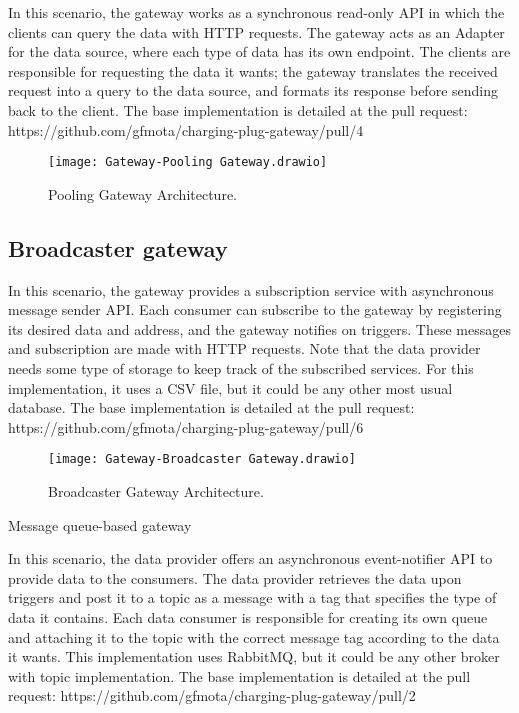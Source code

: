 In this scenario, the gateway works as a synchronous read-only API in which the clients can query the data with HTTP requests. The gateway acts as an Adapter for the data source, where each type of data has its own endpoint. The clients are responsible for requesting the data it wants; the gateway translates the received request into a query to the data source, and formats its response before sending back to the client. The base implementation is detailed at the pull request: https://github.com/gfmota/charging-plug-gateway/pull/4

\begin{figure}
    \centering
    \texttt{[image: Gateway-Pooling Gateway.drawio]}
    \caption{Pooling Gateway Architecture.\label{fig:subfigures3}}
\end{figure}

\subsection*{Broadcaster gateway}
\label{sec:broadcaster}

In this scenario, the gateway provides a subscription service with asynchronous message sender API. Each consumer can subscribe to the gateway by registering its desired data and address, and the gateway notifies on triggers. These messages and subscription are made with HTTP requests. Note that the data provider needs some type of storage to keep track of the subscribed services. For this implementation, it uses a CSV file, but it could be any other most usual database. The base implementation is detailed at the pull request: https://github.com/gfmota/charging-plug-gateway/pull/6

\begin{figure}
    \centering
    \texttt{[image: Gateway-Broadcaster Gateway.drawio]}
    \caption{Broadcaster Gateway Architecture.\label{fig:subfigures4}}
\end{figure}

{Message queue-based gateway}
\label{sec:messagequeue}

In this scenario, the data provider offers an asynchronous event-notifier API to provide data to the consumers. The data provider retrieves the data upon triggers and post it to a topic as a message with a tag that specifies the type of data it contains. Each data consumer is responsible for creating its own queue and attaching it to the topic with the correct message tag according to the data it wants. This implementation uses RabbitMQ, but it could be any other broker with topic implementation. The base implementation is detailed at the pull request: https://github.com/gfmota/charging-plug-gateway/pull/2


